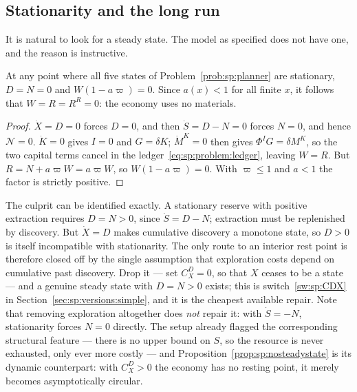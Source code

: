 \subsection{Stationarity and the long run}\label{sec:sp:solution:longrun}

It is natural to look for a steady state. The model as specified does not have one, and the reason
is instructive.

\begin{proposition}\label{prop:sp:nosteadystate}
At any point where all five states of Problem~\ref{prob:sp:planner} are stationary, $D=N=0$ and
$W\left(1-a\varpi\right)=0$. Since $a(x)<1$ for all finite $x$, it follows that $W=R=R^R=0$: the
economy uses no materials.
\end{proposition}

\begin{proof}
$\dot X=D=0$ forces $D=0$, and then $\dot S=D-N=0$ forces $N=0$, and hence $\mathcal N=0$.
$\dot K=0$ gives $I=0$ and $G=\delta K$; $\dot M^K=0$ then gives $\Phi^IG=\delta M^K$, so the two
capital terms cancel in the ledger~\eqref{eq:sp:problem:ledger}, leaving $W=R$. But
$R=N+a\varpi W=a\varpi W$, so $W\left(1-a\varpi\right)=0$. With $\varpi\le1$ and $a<1$ the factor is
strictly positive.
\end{proof}

The culprit can be identified exactly. A stationary reserve with positive extraction requires
$D=N>0$, since $\dot S=D-N$; extraction must be replenished by discovery. But $\dot X=D$ makes
cumulative discovery a monotone state, so $D>0$ is itself incompatible with stationarity. The only
route to an interior rest point is therefore closed off by the single assumption that exploration
costs depend on cumulative past discovery. Drop it --- set $C^D_X=0$, so that $X$ ceases to be a
state --- and a genuine steady state with $D=N>0$ exists; this is switch~\ref{sw:sp:CDX} in
Section~\ref{sec:sp:versions:simple}, and it is the cheapest available repair. Note that removing
exploration altogether does \emph{not} repair it: with $\dot S=-N$, stationarity forces $N=0$
directly. The setup already flagged the corresponding structural feature --- there is no upper bound
on $S$, so the resource is never exhausted, only ever more costly --- and
Proposition~\ref{prop:sp:nosteadystate} is its dynamic counterpart: with $C^D_X>0$ the economy has no
resting point, it merely becomes asymptotically circular.

